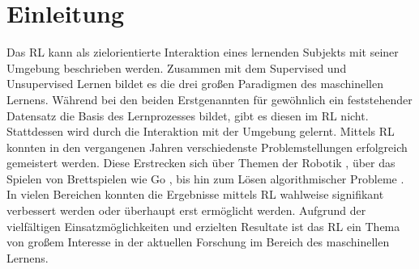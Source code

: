 \chapter{Einleitung}

Das \ac{RL} kann als zielorientierte Interaktion eines lernenden Subjekts mit seiner Umgebung beschrieben werden. Zusammen mit dem Supervised und Unsupervised Lernen bildet es die drei großen Paradigmen des maschinellen Lernens. Während bei den beiden Erstgenannten für gewöhnlich ein feststehender Datensatz die Basis des Lernprozesses bildet, gibt es diesen im \ac{RL} nicht. Stattdessen wird durch die Interaktion mit der Umgebung gelernt. Mittels \ac{RL} konnten in den vergangenen Jahren verschiedenste Problemstellungen erfolgreich gemeistert werden. Diese Erstrecken sich über Themen der Robotik \cite{MappingPlanning}, über das Spielen von Brettspielen wie Go \cite{Go}, bis hin zum Lösen algorithmischer Probleme \cite{DNC}. In vielen Bereichen konnten die Ergebnisse mittels \ac{RL} wahlweise signifikant verbessert werden oder überhaupt erst ermöglicht werden. Aufgrund der vielfältigen Einsatzmöglichkeiten und erzielten Resultate ist das \ac{RL} ein Thema von großem Interesse in der aktuellen Forschung im Bereich des maschinellen Lernens.


